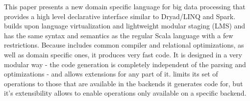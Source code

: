 This paper presents a new domain specific language \tool for big data processing that provides a high level declarative interface similar to Dryad/LINQ and Spark. \tool builds upon language virtualization \cite{moors_scala-virtualized_2012} and lightweight modular staging \cite{rompf_lightweight_2010} (LMS) and has the same syntax and semantics as the regular Scala language with a few restrictions.
Because \tool includes common compiler and relational optimizations, as well as domain specific ones, it produces very fast code. It is designed in a very modular way - the code generation is completely independent of the parsing and optimizations - and allows extensions for any part of it. \tool limits its set of operations to those that are available in the backends it generates code for, but it's extensibility allows to enable operations only available on a specific backend.


